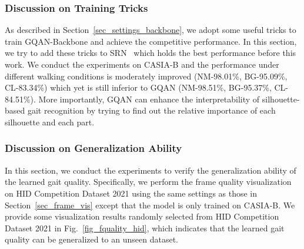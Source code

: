 \subsubsection{Discussion on Training Tricks}
As described in Section~\ref{sec_settings_backbone}, we adopt some useful tricks to train GQAN-Backbone and achieve the competitive performance.
%
In this section, we try to add these tricks to SRN~\cite{hou2021setres} which holds the best performance before this work.
%
We conduct the experiments on CASIA-B and the performance under different walking conditions is moderately improved (NM-98.01\%, BG-95.09\%, CL-83.34\%) which yet is still inferior to GQAN (NM-98.51\%, BG-95.37\%, CL-84.51\%).
%
More importantly, GQAN can enhance the interpretability of silhouette-based gait recognition by trying to find out the relative importance of each silhouette and each part.
%
%

\subsubsection{Discussion on Generalization Ability}
In this section, we conduct the experiments to verify the generalization ability of the learned gait quality.
%
Specifically, we perform the frame quality visualization on HID Competition Dataset 2021 using the same settings as those in Section~\ref{sec_frame_vis} except that the model is only trained on CASIA-B.
%
We provide some visualization results randomly selected from HID Competition Dataset 2021 in Fig.~\ref{fig_fquality_hid}, which indicates that the learned gait quality can be generalized to an unseen dataset.

